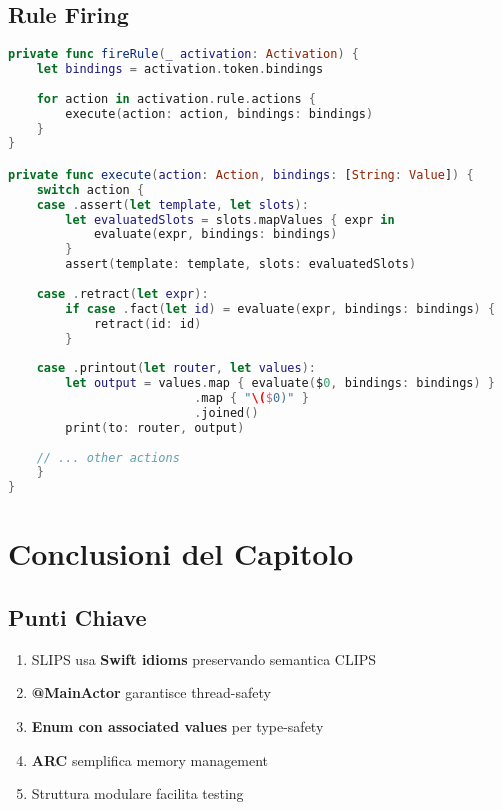 \subsection{Rule Firing}

\begin{lstlisting}[language=Swift]
private func fireRule(_ activation: Activation) {
    let bindings = activation.token.bindings
    
    for action in activation.rule.actions {
        execute(action: action, bindings: bindings)
    }
}

private func execute(action: Action, bindings: [String: Value]) {
    switch action {
    case .assert(let template, let slots):
        let evaluatedSlots = slots.mapValues { expr in
            evaluate(expr, bindings: bindings)
        }
        assert(template: template, slots: evaluatedSlots)
        
    case .retract(let expr):
        if case .fact(let id) = evaluate(expr, bindings: bindings) {
            retract(id: id)
        }
        
    case .printout(let router, let values):
        let output = values.map { evaluate($0, bindings: bindings) }
                          .map { "\($0)" }
                          .joined()
        print(to: router, output)
        
    // ... other actions
    }
}
\end{lstlisting}

\section{Conclusioni del Capitolo}

\subsection{Punti Chiave}

\begin{enumerate}
\item SLIPS usa \textbf{Swift idioms} preservando semantica CLIPS
\item \textbf{@MainActor} garantisce thread-safety
\item \textbf{Enum con associated values} per type-safety
\item \textbf{ARC} semplifica memory management
\item Struttura modulare facilita testing
\end{enumerate}

